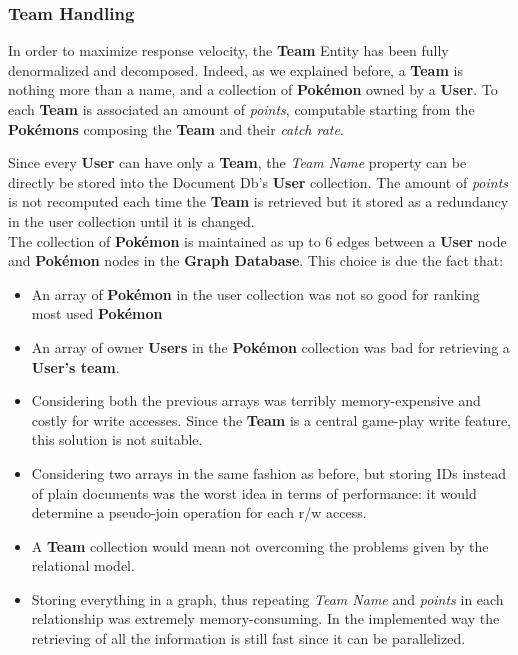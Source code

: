 \subsubsection{Team Handling}
In order to maximize response velocity, the \textbf{Team} Entity has been fully denormalized and decomposed. Indeed, as we explained before, a \textbf{Team} is nothing more than a name, and a collection of \textbf{Pokémon} owned by a \textbf{User}. To each \textbf{Team} is associated an amount of \textit{points}, computable starting from the \textbf{Pokémons} composing the \textbf{Team} and their \textit{catch rate}.

Since every \textbf{User} can have only a \textbf{Team}, the \textit{Team Name} property can be directly be stored into the Document Db’s \textbf{User} collection. 
The amount of \textit{points} is not recomputed each time the \textbf{Team} is retrieved but it stored as a redundancy in the user collection until it is changed. \\
The collection of \textbf{Pokémon} is maintained as up to 6 edges between a \textbf{User} node and \textbf{Pokémon} nodes in the \textbf{Graph Database}. This choice is due the fact that:
\begin{itemize}
	\item An array of \textbf{Pokémon} in the user collection was not so good for ranking most used \textbf{Pokémon}
	\item An array of owner \textbf{Users} in the \textbf{Pokémon} collection was bad for retrieving a \textbf{User’s team}.
	\item Considering both the previous arrays was terribly memory-expensive and costly for write accesses. Since the \textbf{Team} is a central game-play write feature, this solution is not suitable.
	\item Considering two arrays in the same fashion as before, but storing IDs instead of plain documents was the worst idea in terms of performance: it would determine a pseudo-join operation for each r/w access.
	\item A \textbf{Team} collection would mean not overcoming the problems given by the relational model. 
	\item Storing everything in a graph, thus repeating \textit{Team Name} and \textit{points} in each relationship was extremely memory-consuming. In the implemented way the retrieving of all the information is still fast since it can be parallelized.
\end{itemize}

